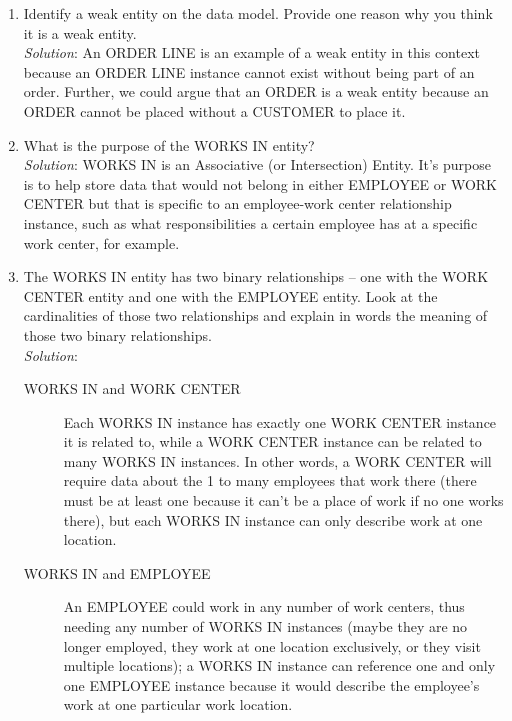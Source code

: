\documentclass{article}
\begin{document}
\begin{enumerate}
\begin{enumerate}
		\item Identify a weak entity on the data model. Provide one reason why you think it is a weak entity.\\

		\textit{Solution}: An ORDER LINE is an example of a weak entity in this context because an ORDER LINE instance cannot exist without being part of an order. Further, we could argue that an ORDER is a weak entity because an ORDER cannot be placed without a CUSTOMER to place it.\\

		\item What is the purpose of the WORKS IN entity?\\

		\textit{Solution}: WORKS IN is an Associative (or Intersection) Entity. It's purpose is to help store data that would not belong in either EMPLOYEE or WORK CENTER but that is specific to an employee-work center relationship instance, such as what responsibilities a certain employee has at a specific work center, for example.\\

		\item The WORKS IN entity has two binary relationships – one with the WORK CENTER entity and one with the EMPLOYEE entity. Look at the cardinalities of those two relationships and explain in words the meaning of those two binary relationships.\\

		\textit{Solution}:
			\begin{description}
				\item[WORKS IN and WORK CENTER] Each WORKS IN instance has exactly one WORK CENTER instance it is related to, while a WORK CENTER instance can be related to many WORKS IN instances. In other words, a WORK CENTER will require data about the 1 to many employees that work there (there must be at least one because it can't be a place of work if no one works there), but each WORKS IN instance can only describe work at one location.\\

				\item[WORKS IN and EMPLOYEE] An EMPLOYEE could work in any number of work centers, thus needing any number of WORKS IN instances (maybe they are no longer employed, they work at one location exclusively, or they visit multiple locations); a WORKS IN instance can reference one and only one EMPLOYEE instance because it would describe the employee's work at one particular work location.\\
			\end{description}


\end{enumerate}
\end{enumerate}
\end{document}
